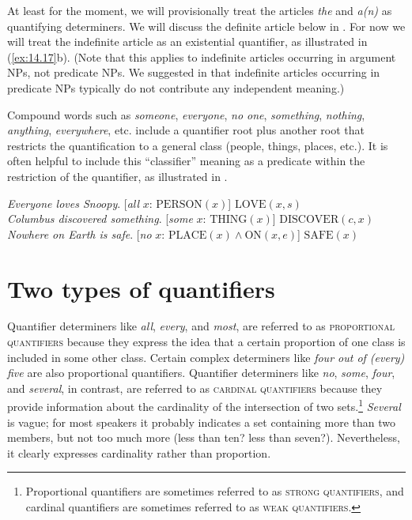 {At least for the moment, we will provisionally treat the articles \textit{the} and \textit{a(n)} as quantifying determiners. We will discuss the definite article below in . For now we will treat the indefinite article as an existential quantifier, as illustrated in (\ref{ex:14.17}b). (Note that this applies to indefinite articles occurring in argument NPs, not predicate NPs. We suggested in  that indefinite articles occurring in predicate NPs typically do not contribute any independent meaning.)



Compound words such as \textit{someone}, \textit{everyone}, \textit{no one}, \textit{something}, \textit{nothing}, \textit{anything}, \textit{everywhere}, etc. include a quantifier root plus another root that restricts the quantification to a general class (people, things, places, etc.). It is often helpful to include this “classifier” meaning as a predicate within the restriction of the quantifier, as illustrated in .


\ea \label{ex:14.18}
\ea \textit{Everyone loves Snoopy}.         \hfill  [\textit{all} $x$: $\text{PERSON}(x)$] $\text{LOVE}(x,s)$\\
\ex \textit{Columbus discovered something}. \hfill [\textit{some} $x$: $\text{THING}(x)$] $\text{DISCOVER}(c,x)$\\
\ex \textit{Nowhere on Earth is safe}.      \hfill [\textit{no} $x$: $\text{PLACE}(x) \wedge \text{ON}(x,e)$] $\text{SAFE}(x)$
                       \z
\z

\section{Two types of quantifiers}\label{sec:14.4}

Quantifier determiners like \textit{all}, \textit{every}, and \textit{most}, are referred to as \textsc{proportional quantifiers} because they express the idea that a certain proportion of one class is included in some other class. Certain complex determiners like \textit{four out of (every) five} are also proportional quantifiers. Quantifier determiners like \textit{no}, \textit{some}, \textit{four}, and \textit{several}, in contrast, are referred to as \textsc{cardinal quantifiers} because they provide information about the cardinality of the intersection of two sets.\footnote{Proportional quantifiers are sometimes referred to as \textsc{strong} \textsc{quantifiers}, and cardinal quantifiers are sometimes referred to as \textsc{weak} \textsc{quantifiers}.} \textit{Several} is vague; for most speakers it probably indicates a set containing more than two members, but not too much more (less than ten? less than seven?). Nevertheless, it clearly expresses cardinality rather than proportion.



}
